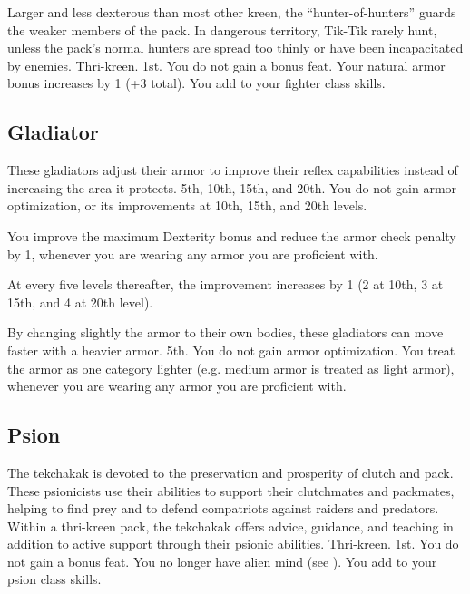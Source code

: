 {Larger and less dexterous than most other kreen, the ``hunter-of-hunters'' guards the weaker members of the pack. In dangerous territory, Tik-Tik rarely hunt, unless the pack's normal hunters are spread too thinly or have been incapacitated by enemies.}
{Thri-kreen.}
{1st.}
{You do not gain a bonus feat.}
{
	Your natural armor bonus increases by 1 (+3 total). You add  to your fighter class skills.
}

\subsection{Gladiator}
{These gladiators adjust their armor to improve their reflex capabilities instead of increasing the area it protects.}
{}
{5th, 10th, 15th, and 20th.}
{You do not gain armor optimization, or its improvements at 10th, 15th, and 20th levels.}
{
	You improve the maximum Dexterity bonus and reduce the armor check penalty by 1, whenever you are wearing any armor you are proficient with.

	At every five levels thereafter, the improvement increases by 1 (2 at 10th, 3 at 15th, and 4 at 20th level).
}
{By changing slightly the armor to their own bodies, these gladiators can move faster with a heavier armor.}
{}
{5th.}
{You do not gain armor optimization.}
{
	You treat the armor as one category lighter (e.g. medium armor is treated as light armor), whenever you are wearing any armor you are proficient with.
}

\subsection{Psion}
{The tekchakak is devoted to the preservation and prosperity of clutch and pack. These psionicists use their abilities to support their clutchmates and packmates, helping to find prey and to defend compatriots against raiders and predators. Within a
thri-kreen pack, the tekchakak offers advice, guidance, and teaching in addition to active support through their psionic abilities.}
{Thri-kreen.}
{1st.}
{You do not gain a bonus feat.}
{
	You no longer have alien mind (see ). You add  to your psion class skills.
}

